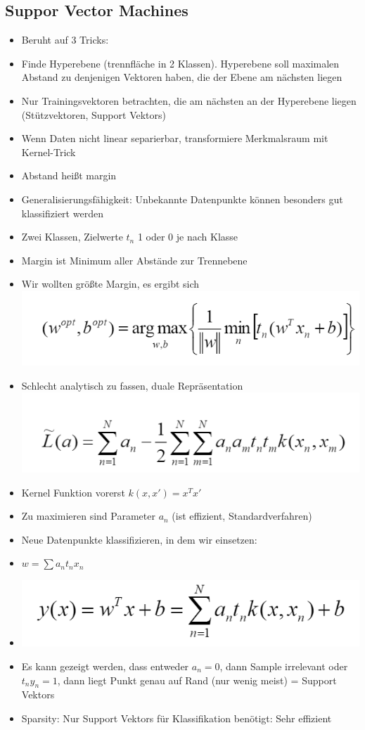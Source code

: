 \documentclass[a4paper,10pt,oneside]{article}
\begin{document}
\subsection{Suppor Vector Machines}
\begin{itemize}
	\item Beruht auf 3 Tricks:
	\item Finde Hyperebene (trennfläche in 2 Klassen). Hyperebene soll maximalen Abstand zu denjenigen Vektoren haben, die der Ebene am nächsten liegen
	\item Nur Trainingsvektoren betrachten, die am nächsten an der Hyperebene liegen (Stützvektoren, Support Vektors)
	\item Wenn Daten nicht linear separierbar, transformiere Merkmalsraum mit Kernel-Trick
	\item Abstand heißt margin
	\item Generalisierungsfähigkeit: Unbekannte Datenpunkte können besonders gut klassifiziert werden
	\item Zwei Klassen, Zielwerte $t_n$ 1 oder 0 je nach Klasse
	\item Margin ist Minimum aller Abstände zur Trennebene
	\item Wir wollten größte Margin, es ergibt sich\includegraphics[scale=0.65]{Grafiken/margin.png}
	\item Schlecht analytisch zu fassen, duale Repräsentation
\includegraphics[scale=0.65]{Grafiken/dualerep.png}
	\item Kernel Funktion vorerst $k(x,x')= x^Tx'$
	\item Zu maximieren sind Parameter $a_n$ (ist effizient, Standardverfahren)
	\item Neue Datenpunkte klassifizieren, in dem wir einsetzen:
	\item $w=\sum a_nt_nx_n$
	\item \includegraphics[scale=0.65]{Grafiken/linearesvm.png}
	\item Es kann gezeigt werden, dass entweder $a_n=0$, dann Sample irrelevant oder $t_ny_n=1$, dann liegt Punkt genau auf Rand (nur wenig meist) = Support Vektors
	\item Sparsity: Nur Support Vektors für Klassifikation benötigt: Sehr effizient
\end{itemize}
\end{document}
